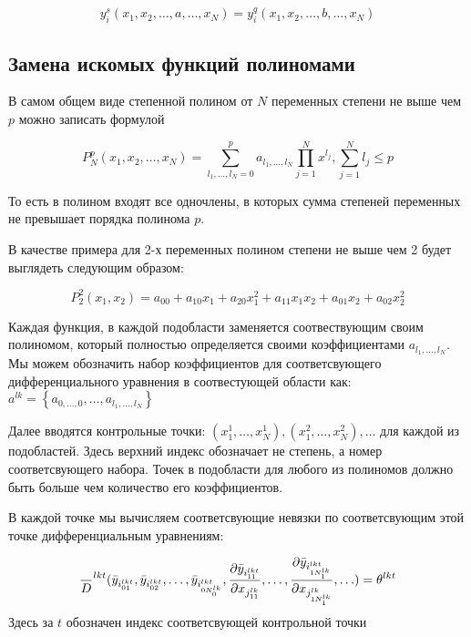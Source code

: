 \documentclass[a4paper,12pt]{article}
\begin{document}
  \begin{equation}
    y_i^s\left(x_1,x_2,\ldots,a,\ldots,x_N\right) = y_i^q\left(x_1,x_2,\ldots,b,\ldots,x_N\right)
  \end{equation}


  \subsection{Замена искомых функций полиномами}


  В самом общем виде степенной полином от $N$ переменных степени не выше чем $p$ можно
  записать формулой
  
  \begin{equation}
    P_N^p(x_1,x_2,\ldots,x_N)=
    \displaystyle\sum_{l_1,\ldots,l_N=0}^{p}a_{l_1,\ldots,l_N}\prod_{j=1}^{N}x^{l_j},
    \displaystyle\sum_{j=1}^{N}l_j \le p
  \end{equation}

  То есть в полином входят все одночлены, в которых сумма степеней
  переменных не превышает порядка полинома $p$.

  В качестве примера для 2-х переменных полином степени не выше чем 2 будет выглядеть следующим образом:

  \begin{equation*}
    P_2^2(x_1,x_2) = a_{00} + a_{10}x_1 + a_{20}x_1^2+ a_{11}x_1x_2 + a_{01}x_2 + a_{02}x_2^2
  \end{equation*}

  Каждая функция, в каждой подобласти заменяется соотвествующим своим
  полиномом, который полностью определяется своими коэффициентами
  $a_{l_1,\ldots,l_N}$. Мы можем обозначить набор коэффициентов для
  соответсвующего дифференциального уравнения в соотвестующей области
  как: $a^{lk} = \left\{ a_{0,\ldots,0},\ldots,a_{l_1,\ldots,l_N} \right\}$ 

  

  Далее вводятся контрольные точки:
  $(x_1^1,\ldots,x_N^1),(x_1^2,\ldots,x_N^2),\ldots$ для каждой из подобластей. Здесь верхний
  индекс обозначает не степень, а номер соответсвующего набора. Точек
  в подобласти для любого из полиномов должно быть больше чем
  количество его коэффициентов.

  В каждой точке мы вычисляем соответсвующие невязки по соответсвующим
  этой точке дифференциальным уравнениям:

  \begin{equation}
    {\over D}^{lkt} ( {\bar y}_{i^{lkt}_{01}}, {\bar y}_{i^{lkt}_{02}},
      \ldots, {\bar y}_{i^{lkt}_{0N^{lk}_0}},\frac{\partial {\bar
          y}_{i^{lkt}_{11}}}{\partial
        x_{j^{lk}_{11}}},\ldots,\frac{\partial {\bar
          y}_{i^{lkt}_{1N^{lk}_1}}}{\partial
        x_{j^{lk}_{1N^{lk}_1}}},\ldots) = \theta^{lkt}
  \end{equation}
  Здесь за $t$ обозначен индекс соответсвующей контрольной точки
  
  
  
\end{document}

